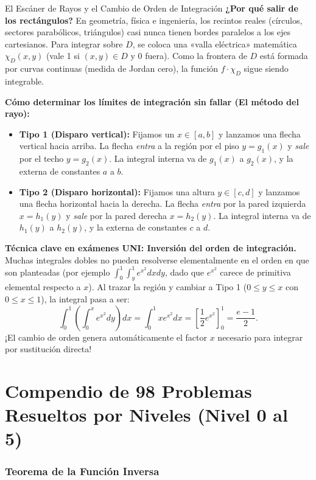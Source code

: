 \documentclass[11pt,a4paper]{article}
\begin{document}
\begin{intuitionbox}{El Escáner de Rayos y el Cambio de Orden de Integración}
\textbf{¿Por qué salir de los rectángulos?} En geometría, física e ingeniería, los recintos reales (círculos, sectores parabólicos, triángulos) casi nunca tienen bordes paralelos a los ejes cartesianos. Para integrar sobre $D$, se coloca una «valla eléctrica» matemática $\chi_D(x,y)$ (vale 1 si $(x,y) \in D$ y 0 fuera). Como la frontera de $D$ está formada por curvas continuas (medida de Jordan cero), la función $f \cdot \chi_D$ sigue siendo integrable.

\textbf{Cómo determinar los límites de integración sin fallar (El método del rayo):}
\begin{itemize}[noitemsep]
    \item \textbf{Tipo 1 (Disparo vertical):} Fijamos un $x \in [a,b]$ y lanzamos una flecha vertical hacia arriba. La flecha \textit{entra} a la región por el piso $y = g_1(x)$ y \textit{sale} por el techo $y = g_2(x)$. La integral interna va de $g_1(x)$ a $g_2(x)$, y la externa de constantes $a$ a $b$.
    \item \textbf{Tipo 2 (Disparo horizontal):} Fijamos una altura $y \in [c,d]$ y lanzamos una flecha horizontal hacia la derecha. La flecha \textit{entra} por la pared izquierda $x = h_1(y)$ y \textit{sale} por la pared derecha $x = h_2(y)$. La integral interna va de $h_1(y)$ a $h_2(y)$, y la externa de constantes $c$ a $d$.
\end{itemize}

\textbf{Técnica clave en exámenes UNI: Inversión del orden de integración.}
Muchas integrales dobles no pueden resolverse elementalmente en el orden en que son planteadas (por ejemplo $\int_0^1 \int_y^1 e^{x^2} dx dy$, dado que $e^{x^2}$ carece de primitiva elemental respecto a $x$). Al trazar la región y cambiar a Tipo 1 ($0 \le y \le x$ con $0 \le x \le 1$), la integral pasa a ser:
\[
\int_0^1 \left( \int_0^x e^{x^2} dy \right) dx = \int_0^1 x e^{x^2} dx = \left[ \frac{1}{2} e^{x^2} \right]_0^1 = \frac{e - 1}{2}.
\]
¡El cambio de orden genera automáticamente el factor $x$ necesario para integrar por sustitución directa!
\end{intuitionbox}

\newpage
\part{Compendio de 98 Problemas Resueltos por Niveles (Nivel 0 al 5)}

\section{Teorema de la Función Inversa}
\end{document}
